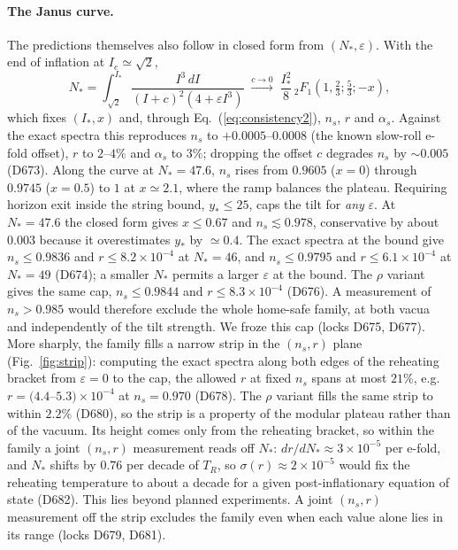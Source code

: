 \documentclass[aps,prd,twocolumn,superscriptaddress,nofootinbib,floatfix]{revtex4-2}
\begin{document}
\paragraph{The Janus curve.} The predictions themselves also follow in closed form from $(N_*,\varepsilon)$. With the end of inflation at $I_e\simeq\sqrt2$,
\begin{equation}
N_*=\int_{\sqrt2}^{I_*}\frac{I^3\,dI}{(I+c)^2(4+\varepsilon I^3)}\;\xrightarrow{c\to0}\;\frac{I_*^2}{8}\,{}_2F_1\!\left(1,\tfrac23;\tfrac53;-x\right),
\end{equation}
which fixes $(I_*,x)$ and, through Eq.~(\ref{eq:consistency2}), $n_s$, $r$ and $\alpha_s$. Against the exact spectra this reproduces $n_s$ to $+0.0005$--$0.0008$ (the known slow-roll e-fold offset), $r$ to $2$--$4\%$ and $\alpha_s$ to $3\%$; dropping the offset $c$ degrades $n_s$ by $\sim0.005$ (D673). Along the curve at $N_*=47.6$, $n_s$ rises from $0.9605$ ($x=0$) through $0.9745$ ($x=0.5$) to $1$ at $x\simeq2.1$, where the ramp balances the plateau. Requiring horizon exit inside the string bound, $y_*\le25$, caps the tilt for \emph{any} $\varepsilon$. At $N_*=47.6$ the closed form gives $x\le0.67$ and $n_s\lesssim0.978$, conservative by about $0.003$ because it overestimates $y_*$ by $\simeq0.4$. The exact spectra at the bound give $n_s\le0.9836$ and $r\le8.2\times10^{-4}$ at $N_*=46$, and $n_s\le0.9795$ and $r\le6.1\times10^{-4}$ at $N_*=49$ (D674); a smaller $N_*$ permits a larger $\varepsilon$ at the bound. The $\rho$ variant gives the same cap, $n_s\le0.9844$ and $r\le8.3\times10^{-4}$ (D676). A measurement of $n_s>0.985$ would therefore exclude the whole home-safe family, at both vacua and independently of the tilt strength. We froze this cap (locks D675, D677). More sharply, the family fills a narrow strip in the $(n_s,r)$ plane (Fig.~\ref{fig:strip}): computing the exact spectra along both edges of the reheating bracket from $\varepsilon=0$ to the cap, the allowed $r$ at fixed $n_s$ spans at most $21\%$, e.g.\ $r=(4.4$--$5.3)\times10^{-4}$ at $n_s=0.970$ (D678). The $\rho$ variant fills the same strip to within $2.2\%$ (D680), so the strip is a property of the modular plateau rather than of the vacuum. Its height comes only from the reheating bracket, so within the family a joint $(n_s,r)$ measurement reads off $N_*$: $dr/dN_*\approx3\times10^{-5}$ per e-fold, and $N_*$ shifts by $0.76$ per decade of $T_R$, so $\sigma(r)\approx2\times10^{-5}$ would fix the reheating temperature to about a decade for a given post-inflationary equation of state (D682). This lies beyond planned experiments. A joint $(n_s,r)$ measurement off the strip excludes the family even when each value alone lies in its range (locks D679, D681).
\end{document}
